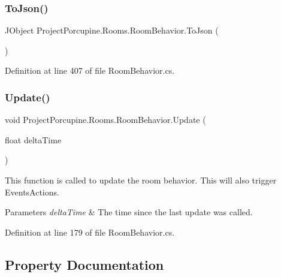 \subsubsection{\texorpdfstring{To\+Json()}{ToJson()}}
{\footnotesize\ttfamily J\+Object Project\+Porcupine.\+Rooms.\+Room\+Behavior.\+To\+Json (\begin{DoxyParamCaption}{ }\end{DoxyParamCaption})}



Definition at line 407 of file Room\+Behavior.\+cs.

\mbox{\label{class_project_porcupine_1_1_rooms_1_1_room_behavior_a83f1d23b050fb5e8ce2e06a67f7b2fbc}} 
\subsubsection{\texorpdfstring{Update()}{Update()}}
{\footnotesize\ttfamily void Project\+Porcupine.\+Rooms.\+Room\+Behavior.\+Update (\begin{DoxyParamCaption}\item[{float}]{delta\+Time }\end{DoxyParamCaption})}



This function is called to update the room behavior. This will also trigger Events\+Actions. 


\begin{DoxyParams}{Parameters}
{\em delta\+Time} & The time since the last update was called.\\
\hline
\end{DoxyParams}


Definition at line 179 of file Room\+Behavior.\+cs.



\subsection{Property Documentation}
\mbox{\label{class_project_porcupine_1_1_rooms_1_1_room_behavior_ad30cb9e324be3e4eb582015e2c25c77a}} 
